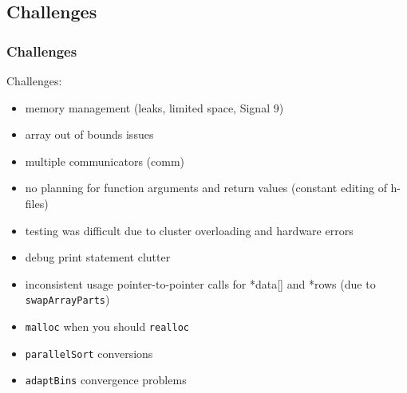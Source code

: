\documentclass[usernames,dvipsnames]{beamer}
\begin{document}
\subsection{Challenges}

\begin{frame}	
	\frametitle{Challenges}
	
	\begin{alertblock}{Challenges:}
		\begin{itemize}
		\item memory management (leaks, limited space, Signal 9)
		\item array out of bounds issues
		\item multiple communicators (comm)
		\item no planning for function arguments and return values (constant editing of h-files)
		\item testing was difficult due to cluster overloading and hardware errors
		\item debug print statement clutter
		\item inconsistent usage pointer-to-pointer calls for *data[] and *rows (due to \texttt{swapArrayParts})
		\item \texttt{malloc} when you should \texttt{realloc}
		\item \texttt{parallelSort} conversions
		\item \texttt{adaptBins} convergence problems
		\end{itemize}
	\end{alertblock}

\end{frame}
\end{document}
